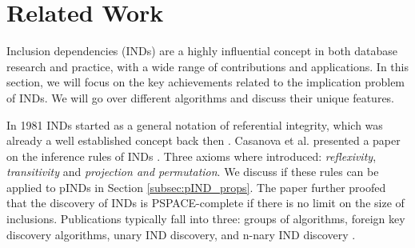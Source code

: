 \chapter{Related Work}\label{sec:rel_work}

Inclusion dependencies (INDs) are a highly influential concept in both database research and practice, with a wide range of contributions and applications. In this section, we will focus on the key achievements related to the implication problem of INDs. We will go over different algorithms and discuss their unique features.

In 1981 INDs started as a general notation of referential integrity, which was already a well established concept back then \cite{date1981referential}. Casanova et al. presented a paper on the inference rules of INDs \cite{casanova1982inclusion}. Three axioms where introduced: \textit{reflexivity}, \textit{transitivity} and \textit{projection and permutation}. We discuss if these rules can be applied to pINDs in Section \ref{subsec:pIND_props}. The paper further proofed that the discovery of INDs is PSPACE-complete if there is no limit on the size of inclusions. Publications typically fall into three: groups of algorithms, foreign key discovery algorithms, unary IND discovery, and n-nary IND discovery \cite{papenbrock2017data}.
